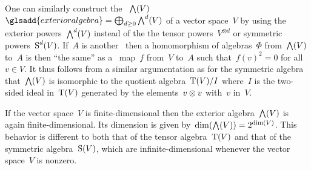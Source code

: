 \begin{remark}
  One can similarly construct the ~$\operatorname{\bigwedge}(V)$~$\glsadd{exterior algebra} = \bigoplus_{d \geq 0} \Exterior^d(V)$ of a vector space~$V$ by using the exterior powers~$\operatorname{\bigwedge}^d(V)$ instead of the the tensor powers~$V^{\otimes d}$ or symmetric powers~$\operatorname{S}^d(V)$.
  If~$A$ is another~\algebra{$\kf$} then a homomorphism of algebras~$\Phi$ from~$\operatorname{\bigwedge}(V)$ to~$A$ is then \enquote{the same} as a~\linear{$\kf$} map~$f$ from~$V$ to~$A$ such that~$f(v)^2 = 0$ for all~$v \in V$.
  It thus follows from a similar argumentation as for the symmetric algebra that~$\operatorname{\bigwedge}(V)$ is isomorphic to the quotient algebra~$\operatorname{T}(V)/I$ where~$I$ is the two-sided ideal in~$\operatorname{T}(V)$ generated by the elements~$v \otimes v$ with~$v$ in~$V$.
  
  If the vector space~$V$ is finite-dimensional then the exterior algebra~$\operatorname{\bigwedge}(V)$ is again finite-dimensional.
  Its dimension is given by~$\dim( \operatorname{\bigwedge}(V) ) = 2^{\dim(V)}$.
  This behavior is different to both that of the tensor algebra~$\operatorname{T}(V)$ and that of the symmetric algebra~$\operatorname{S}(V)$, which are infinite-dimensional whenever the vector space~$V$ is nonzero.
\end{remark}





